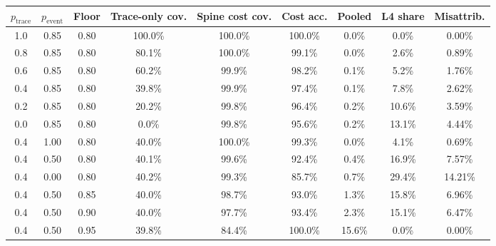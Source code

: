 \begin{tabular}{@{}ccccccccc@{}}
\toprule
$p_{\mathrm{trace}}$ & $p_{\mathrm{event}}$ & Floor & Trace-only cov. & Spine cost cov. & Cost acc. & Pooled & L4 share & Misattrib. \\
\midrule
1.0 & 0.85 & 0.80 & 100.0\% & 100.0\% & 100.0\% & 0.0\% & 0.0\% & 0.00\% \\
0.8 & 0.85 & 0.80 & 80.1\% & 100.0\% & 99.1\% & 0.0\% & 2.6\% & 0.89\% \\
0.6 & 0.85 & 0.80 & 60.2\% & 99.9\% & 98.2\% & 0.1\% & 5.2\% & 1.76\% \\
0.4 & 0.85 & 0.80 & 39.8\% & 99.9\% & 97.4\% & 0.1\% & 7.8\% & 2.62\% \\
0.2 & 0.85 & 0.80 & 20.2\% & 99.8\% & 96.4\% & 0.2\% & 10.6\% & 3.59\% \\
0.0 & 0.85 & 0.80 & 0.0\% & 99.8\% & 95.6\% & 0.2\% & 13.1\% & 4.44\% \\
0.4 & 1.00 & 0.80 & 40.0\% & 100.0\% & 99.3\% & 0.0\% & 4.1\% & 0.69\% \\
0.4 & 0.50 & 0.80 & 40.1\% & 99.6\% & 92.4\% & 0.4\% & 16.9\% & 7.57\% \\
0.4 & 0.00 & 0.80 & 40.2\% & 99.3\% & 85.7\% & 0.7\% & 29.4\% & 14.21\% \\
0.4 & 0.50 & 0.85 & 40.0\% & 98.7\% & 93.0\% & 1.3\% & 15.8\% & 6.96\% \\
0.4 & 0.50 & 0.90 & 40.0\% & 97.7\% & 93.4\% & 2.3\% & 15.1\% & 6.47\% \\
0.4 & 0.50 & 0.95 & 39.8\% & 84.4\% & 100.0\% & 15.6\% & 0.0\% & 0.00\% \\
\bottomrule
\end{tabular}
